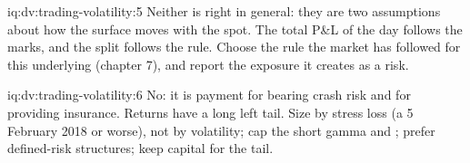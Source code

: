 \begin{solution}{iq:dv:trading-volatility:5}
Neither is right in general: they are two assumptions about how the surface moves with the spot. The total P\&L of the day follows the marks, and the split
follows the rule. Choose the rule the market has followed for this underlying (chapter 7), and report the  exposure it creates as a risk.
\end{solution}

\begin{solution}{iq:dv:trading-volatility:6}
No: it is payment for bearing crash risk and for providing insurance. Returns have a long left tail. Size by stress loss (a 5 February 2018 or worse), not by
volatility; cap the short gamma and ; prefer defined-risk structures; keep capital for the tail.
\end{solution}
